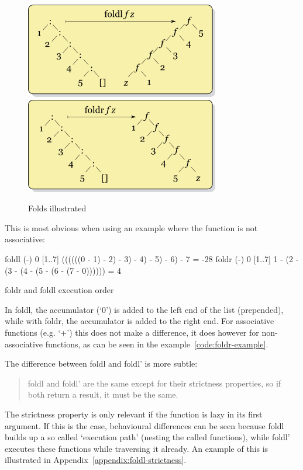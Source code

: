 \begin{figure}[h!]
    \centering
    \includegraphics[scale=0.5]{../img/foldl.png}
    \includegraphics[scale=0.5]{../img/foldr.png}
    \caption{Folds illustrated\autocite{fold-wiki}}
    \label{fig:fold}
\end{figure}

This is most obvious when using an example where the function is not associative:

\begin{listing}
    \begin{haskellcode}
foldl (-) 0 [1..7]
((((((0 - 1) - 2) - 3) - 4) - 5) - 6) - 7 = -28
foldr (-) 0 [1..7]
1 - (2 - (3 - (4 - (5 - (6 - (7 - 0)))))) = 4
    \end{haskellcode}
    \caption{foldr and foldl execution order}\label{code:foldr-example}
\end{listing}
In foldl, the accumulator (`0') is added to the left end of the list (prepended),
while with foldr, the accumulator is added to the right end.
For associative functions (e.g. `+') this does not make a difference, it does
however for non-associative functions, as can be seen in the example~\ref{code:foldr-example}.

The difference between foldl and foldl' is more subtle:
\begin{quote}
    foldl and foldl' are the same except for their strictness properties, so if both
    return a result, it must be the same.\autocite{fold-types}
\end{quote}

The strictness property is only relevant if the function is lazy in its first argument.
If this is the case, behavioural differences can be seen because foldl builds up a so
called `execution path' (nesting the called functions), while foldl' executes these
functions while traversing it already. An example of this is illustrated in
Appendix~\ref{appendix:foldl-strictness}.

